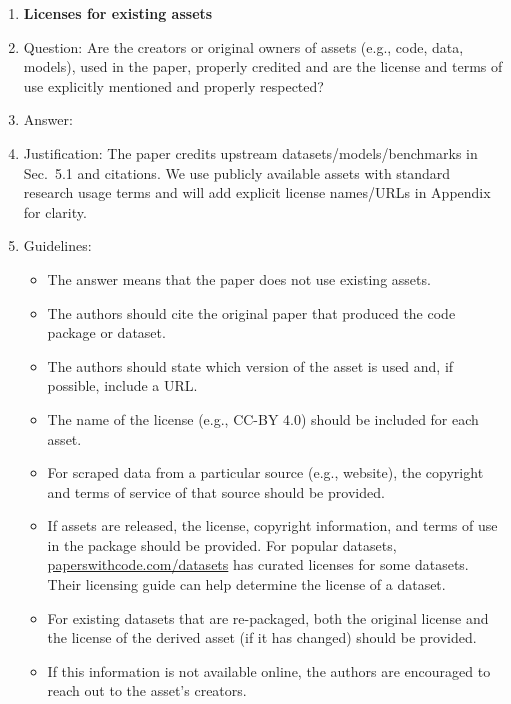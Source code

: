 \documentclass{article}
\begin{document}
\begin{enumerate}
\item {\bf Licenses for existing assets}
    \item[] Question: Are the creators or original owners of assets (e.g., code, data, models), used in the paper, properly credited and are the license and terms of use explicitly mentioned and properly respected?
    \item[] Answer: \answerYes{} %
    \item[] Justification: The paper credits upstream datasets/models/benchmarks in Sec.~5.1 and citations. We use publicly available assets with standard research usage terms and will add explicit license names/URLs in Appendix for clarity.
    \item[] Guidelines:
    \begin{itemize}
        \item The answer \answerNA{} means that the paper does not use existing assets.
        \item The authors should cite the original paper that produced the code package or dataset.
        \item The authors should state which version of the asset is used and, if possible, include a URL.
        \item The name of the license (e.g., CC-BY 4.0) should be included for each asset.
        \item For scraped data from a particular source (e.g., website), the copyright and terms of service of that source should be provided.
        \item If assets are released, the license, copyright information, and terms of use in the package should be provided. For popular datasets, \url{paperswithcode.com/datasets} has curated licenses for some datasets. Their licensing guide can help determine the license of a dataset.
        \item For existing datasets that are re-packaged, both the original license and the license of the derived asset (if it has changed) should be provided.
        \item If this information is not available online, the authors are encouraged to reach out to the asset's creators.
    \end{itemize}


\end{enumerate}
\end{document}
